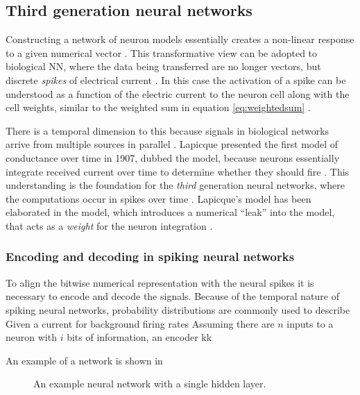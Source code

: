 \documentclass[report.tex]{subfiles}
\begin{document}
\subsection{Third generation neural networks}
Constructing a network of neuron models essentially creates a non-linear
response to a given numerical vector \cite{Russel2007}.
This transformative view can be adopted to biological \gls{NN}, where
the data being transferred are no longer vectors, but discrete
\textit{spikes} of electrical current \cite[p. 32]{Dayan2001, Eliasmith2004}.
In this case the activation of a spike can be understood as a function
of the electric current to the neuron cell along with the cell weights,
similar to the weighted sum in equation \ref{eq:weightedsum}
\cite[p. 234]{Dayan2001}.

There is a temporal dimension to this because signals in biological 
networks arrive from multiple sources in parallel \cite{Eliasmith2004}.
Lapicque presented the first model of conductance over time in 1907,
dubbed the  model, because neurons essentially
integrate received current over time to determine whether they should fire 
\cite{Dayan2001, Eliasmith2004}.
This understanding is the foundation for the \textit{third} generation
neural networks, where the computations occur in spikes over time 
\cite{Maass1997}.
Lapicque's model has been elaborated in the  model, which introduces a numerical ``leak''
into the model, that acts as a \textit{weight} for the neuron integration
\cite{Eliasmith2004, Eliasmith2015}.

\subsubsection{Encoding and decoding in spiking neural networks}
To align the bitwise numerical representation with the neural spikes
it is necessary to encode and decode the signals.
Because of the temporal nature of spiking neural networks, probability
distributions are commonly used to describe 
Given a current for background firing rates
Assuming there are $n$ inputs to a neuron with $i$ bits of information,
an encoder kk


An example of a network is shown in 

\begin{figure}
\centering
{}
\caption{An example neural network with a single hidden layer.}
\label{fig:nn-example}
\end{figure}
\end{document}
